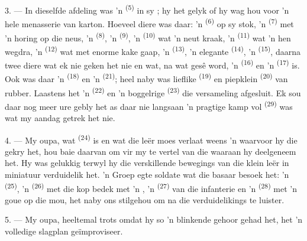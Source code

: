 3. --- In dieselfde afdeling was 'n  \textsuperscript{(5)} in sy
; hy het gelyk of hy wag hou voor 'n hele menasserie van karton.
Hoeveel diere was daar: 'n  \textsuperscript{(6)} op sy stok, 'n
 \textsuperscript{(7)} met 'n horing op die neus, 'n 
\textsuperscript{(8)}, 'n  \textsuperscript{(9)}, 'n 
\textsuperscript{(10)} wat 'n neut kraak, 'n  \textsuperscript{(11)} wat
'n hen wegdra, 'n  \textsuperscript{(12)} wat met enorme kake gaap, 'n
 \textsuperscript{(13)}, 'n elegante 
\textsuperscript{(14)}, 'n  \textsuperscript{(15)}, daarna twee diere wat
ek nie geken het nie en wat, na wat gesê word, 'n  \textsuperscript{(16)}
en 'n  \textsuperscript{(17)} is. Ook was daar 'n 
\textsuperscript{(18)} en 'n  \textsuperscript{(21)}; heel naby was
lieflike  \textsuperscript{(19)} en piepklein 
\textsuperscript{(20)} van rubber. Laastens het 'n 
\textsuperscript{(22)} en 'n boggelrige  \textsuperscript{(23)} die
versameling afgesluit. Ek sou daar nog meer ure gebly het as daar nie langsaan 'n
pragtige kamp vol  \textsuperscript{(29)} was wat my aandag
getrek het nie.

\VUsaut{4.0mm}
\VUsaut{2.8mm}

4. --- My oupa, wat  \textsuperscript{(24)} is en wat die leër moes
verlaat weens 'n  waarvoor hy die  gekry het, hou
baie daarvan om vir my te vertel van die  waaraan hy deelgeneem het.
Hy was gelukkig terwyl hy die verskillende bewegings van die klein leër in miniatuur
verduidelik het. 'n Groep egte soldate wat die basaar besoek het: 'n
 \textsuperscript{(25)}, 'n 
\textsuperscript{(26)} met die kop bedek met 'n , 'n
 \textsuperscript{(27)} van die infanterie en 'n
 \textsuperscript{(28)} met 'n goue  op die mou,
het naby ons stilgehou om na die verduidelikings te luister.

5. --- My oupa, heeltemal trots omdat hy so 'n blinkende gehoor gehad het, het 'n
volledige slagplan geïmproviseer.


